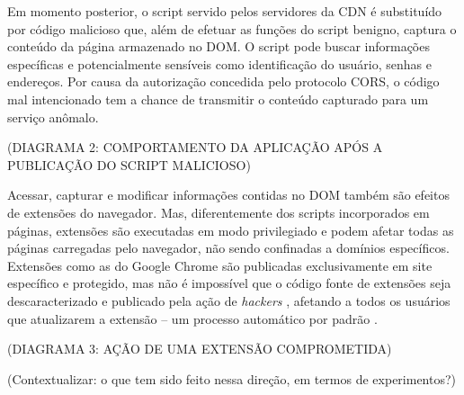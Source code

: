Em momento posterior, o script servido pelos servidores da CDN é substituído por código malicioso que, além de efetuar as funções do script benigno, captura o conteúdo da página armazenado no DOM. O script pode buscar informações específicas e potencialmente sensíveis como identificação do usuário, senhas e endereços. Por causa da autorização concedida pelo protocolo CORS, o código mal intencionado tem a chance de transmitir o conteúdo capturado para um serviço anômalo.

(DIAGRAMA 2: COMPORTAMENTO DA APLICAÇÃO APÓS A PUBLICAÇÃO DO SCRIPT MALICIOSO)

Acessar, capturar e modificar informações contidas no DOM também são efeitos de extensões do navegador. Mas, diferentemente dos scripts incorporados em páginas, extensões são executadas em modo privilegiado e podem afetar todas as páginas carregadas pelo navegador, não sendo confinadas a domínios específicos. Extensões como as do Google Chrome são publicadas exclusivamente em site específico e protegido, mas não é impossível que o código fonte de extensões seja descaracterizado e publicado pela ação de \textit{hackers} \cite{Spring2017}, afetando a todos os usuários que atualizarem a extensão -- um processo automático por padrão \cite{Google2017}. 

(DIAGRAMA 3: AÇÃO DE UMA EXTENSÃO COMPROMETIDA)





(Contextualizar: o que tem sido feito nessa direção, em termos de experimentos?)

